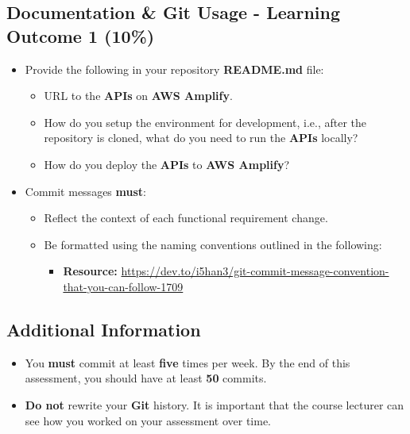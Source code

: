 \documentclass{article}
\begin{document}
\subsection*{Documentation \& Git Usage - Learning Outcome 1 (10\%)}
\begin{itemize}
    \item Provide the following in your repository \textbf{README.md} file:
    \begin{itemize}
        \item URL to the \textbf{APIs} on \textbf{AWS Amplify}.
        \item How do you setup the environment for development, i.e., after the repository is cloned, what do you need to run the \textbf{APIs} locally?
        \item How do you deploy the \textbf{APIs} to \textbf{AWS Amplify}?
    \end{itemize}
    \item Commit messages \textbf{must}:
    \begin{itemize}
      \item Reflect the context of each functional requirement change. 
      \item Be formatted using the naming conventions outlined in the following:
      \begin{itemize}
        \item \textbf{Resource:} \small\href{https://dev.to/i5han3/git-commit-message-convention-that-you-can-follow-1709}{https://dev.to/i5han3/git-commit-message-convention-that-you-can-follow-1709}
      \end{itemize} 
    \end{itemize}
  \end{itemize}
  
  \subsection*{Additional Information}
  \begin{itemize}
    \item You \textbf{must} commit at least \textbf{five} times per week. By the end of this assessment, you should have at least \textbf{50} commits.
    \item \textbf{Do not} rewrite your \textbf{Git} history. It is important that the course lecturer can see how you worked on your assessment over time. 
  \end{itemize}
\end{document}
